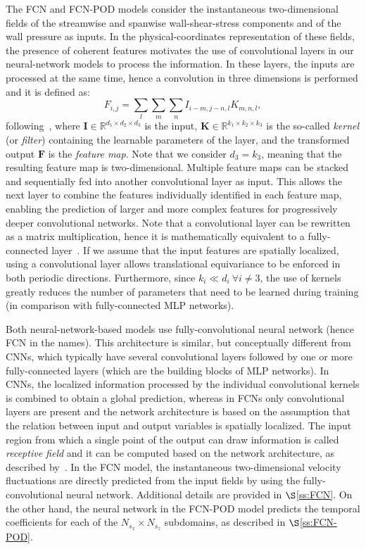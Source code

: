 The FCN and FCN-POD models consider the instantaneous two-dimensional fields of the streamwise and spanwise wall-shear-stress components and of the wall pressure as inputs.
In the physical-coordinates representation of these fields, the presence of coherent features motivates the use of convolutional layers in our neural-network models to process the information.
In these layers, the inputs are processed at the same time, hence a convolution in three dimensions is performed and it is defined as:
\begin{equation}
    F_{i,j} = \sum_l \sum_m \sum_n I_{i-m,j-n,l}K_{m,n,l},
\end{equation}
\noindent following~\cite{goodfellow2016deep}, where $\mathbf{I} \in \mathbb{R}^{d_1 \times d_2 \times d_3}$ is the input, $\mathbf{K} \in \mathbb{R}^{k_1 \times k_2 \times k_3}$ is the so-called \textit{kernel} (or \textit{filter}) containing the learnable parameters of the layer, and the transformed output $\mathbf{F}$ is the \textit{feature map}.
Note that we consider $d_3 = k_3$, meaning that the resulting feature map is two-dimensional.
Multiple feature maps can be stacked and sequentially fed into another convolutional layer as input.
This allows the next layer to combine the features individually identified in each feature map, enabling the prediction of larger and more complex features for progressively deeper convolutional networks.
Note that a convolutional layer can be rewritten as a matrix multiplication, hence it is mathematically equivalent to a fully-connected layer~\cite{wei2017equivalence}.
If we assume that the input features are spatially localized, using a convolutional layer allows translational equivariance to be enforced in both periodic directions.
Furthermore, since $k_i \ll d_i\ \forall i\neq 3$, the use of kernels greatly reduces the number of parameters that need to be learned during training (in comparison with fully-connected MLP networks).

Both neural-network-based models use fully-convolutional neural network (hence FCN in the names).
This architecture is similar, but conceptually different from CNNs, which typically have several convolutional layers followed by one or more fully-connected layers (which are the building blocks of MLP networks).
In CNNs, the localized information processed by the individual convolutional kernels is combined to obtain a global prediction, whereas in FCNs only convolutional layers are present and the network architecture is based on the assumption that the relation between input and output variables is spatially localized.
The input region from which a single point of the output can draw information is called \textit{receptive field} and it can be computed based on the network architecture, as described by~\citet{dumoulin2016guide}.
In the FCN model, the instantaneous two-dimensional velocity fluctuations are directly predicted from the input fields by using the fully-convolutional neural network.
Additional details are provided in $\S$\ref{ss:FCN}.
On the other hand, the neural network in the FCN-POD model predicts the temporal coefficients for each of the $N_{s_x}\times N_{s_z}$ subdomains, as described in $\S$\ref{ss:FCN-POD}.

